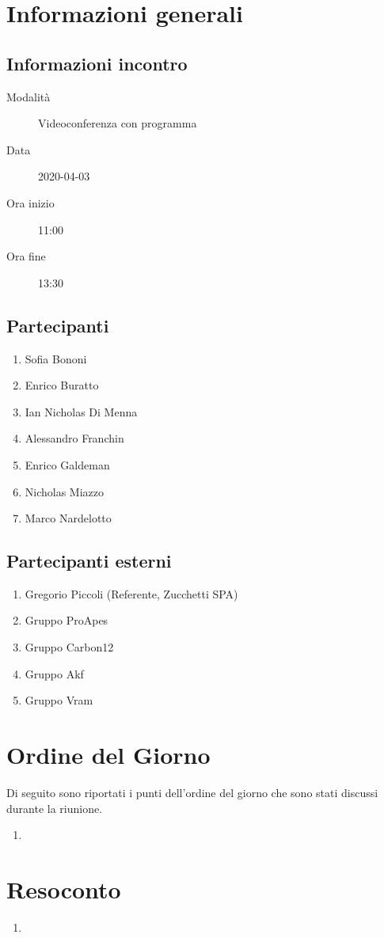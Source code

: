 \documentclass{article}
\begin{document}


\section{Informazioni generali}%
\label{sec:informazioni_generali}

\subsection{Informazioni incontro}%
\label{sub:informazioni_incontro}

\begin{description}
  \item[Modalità] Videoconferenza con programma 
  \item[Data] 2020-04-03
  \item[Ora inizio] 11:00
  \item[Ora fine] 13:30
\end{description}

\subsection{Partecipanti}%
\label{sub:partecipanti}

\begin{enumerate}
  \item Sofia Bononi
  \item Enrico Buratto
  \item Ian Nicholas Di Menna
  \item Alessandro Franchin
  \item Enrico Galdeman
  \item Nicholas Miazzo
  \item Marco Nardelotto
\end{enumerate}

\subsection{Partecipanti esterni}%
\label{sub:partecipanti esterni}

\begin{enumerate}
    \item Gregorio Piccoli (Referente, Zucchetti SPA)
    \item Gruppo ProApes
    \item Gruppo Carbon12
    \item Gruppo Akf
    \item Gruppo Vram
\end{enumerate}


\section{Ordine del Giorno}%
\label{ordine_del_giorno}
Di seguito sono riportati i punti dell'ordine del giorno che sono stati discussi durante la riunione.
\begin{enumerate}
  \item 
\end{enumerate}

\section{Resoconto}%
\label{resoconto}
\begin{enumerate}
  \item \textbf{}
\end{enumerate}
\end{document}

